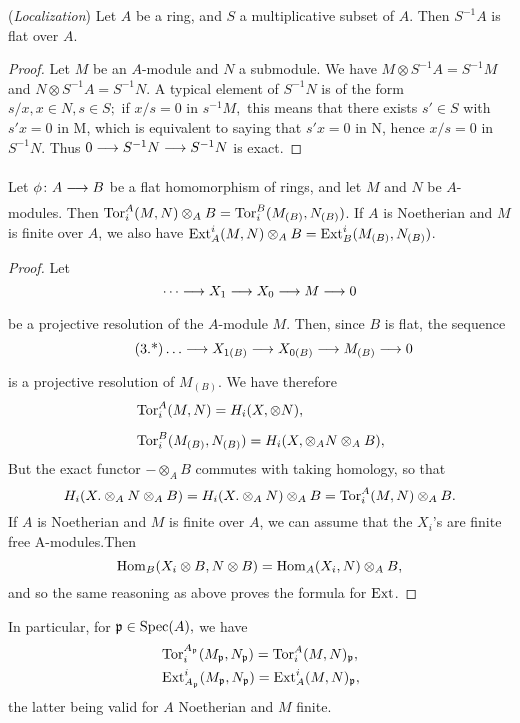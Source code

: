 \documentclass[../main]{subfiles}
\begin{document}
\newparagraph (\emph{Localization}) Let $A$ be a ring, and $S$ a multiplicative subset of $A$. Then $S^{-1}A$ is flat over $A$. 

\begin{proof} 
    Let $M$ be an $A$-module and $N$ a submodule. We have $M \otimes S^{-1}A = S^{-1}M$ and $N \otimes S^{-1}A = S^{-1}N.$ A typical element of $S^{-1}N$ is of the form $s/ x, x\in N, s \in S;$ if $x/ s = 0$ in $s^{-1}M,$ this means that there exists $s' \in S$ with $s'x = 0 $ in M, which is equivalent to saying that $s'x = 0$ in N, hence $x/ s =0$ in $S^{-1}N.$ Thus $0 \varrightarrow{} S^{-1}N \varrightarrow{} S^{-1}N$ is exact.
\end{proof}

\newparagraph Let $\phi\colon A \varrightarrow{} B  $ be a flat homomorphism of rings, and let $M$ and $N$ be $A$-modules. Then $\operatorname{Tor}_i^A(M,N) \otimes_A B = \operatorname{Tor}_i^B (M_{(B)}, N_{(B)}) $. If $A$ is Noetherian and $M$ is finite over $A$, we also have $\operatorname{Ext}_A^i(M,N) \otimes_AB = \operatorname{Ext}_B^i(M_{(B)}, N_{(B)}) $. 


\begin{proof} 
    Let \[\cdots \varrightarrow{} X_1 \varrightarrow{} X_0 \varrightarrow{} M \varrightarrow{} 0\] be a projective resolution of the $A$-module $M$. Then, since $B$ is flat, the sequence
     \[\tag{3.*}\label{eqn:3.*}
        \ldots \varrightarrow{} X_{1(B)} \varrightarrow{} X_{0(B)} \varrightarrow{} M_{(B)} \varrightarrow{} 0
    \]
    is a projective resolution of $M_{(B)}$. We have therefore 
    \begin{align*}
        &\operatorname{Tor}_i^A(M,N) = H_i(X,\otimes N),\\[0.5em]
        &\operatorname{Tor}_i^B(M_{(B)}, N_{(B)}) = H_i(X, \otimes_A N \otimes_A B),
    \end{align*}
    But the exact functor $-\otimes_AB$ commutes with taking homology, so that 
    \[
        H_i(X.\otimes_AN\otimes_A B) = H_i(X.\otimes_AN)\otimes_A B = \operatorname{Tor}_i^A (M,N) \otimes_AB.
    \] 
    If $A$ is Noetherian and $M$ is finite over $A$, we can assume that the $X_i$'s are finite free A-modules.Then \[\operatorname{Hom}_B(X_i\otimes B, N \otimes B) = \operatorname{Hom}_A(X_i, N) \otimes_A B,\] and so the same reasoning as above proves the formula for $\operatorname{Ext}$. 
\end{proof}
In particular, for $\mathfrak{p} \in \operatorname{Spec}(A),$ we have 
\begin{align*}
    &\operatorname{Tor}_i^{A_{\mathfrak{p}}} (M_{\mathfrak{p}}, N_{\mathfrak{p}}) = \operatorname{Tor}_i^A (M,N)_{\mathfrak{p}}, \\
    &\operatorname{Ext}^i_{A_{\mathfrak{p}}} (M_{\mathfrak{p}}, N_{\mathfrak{p}}) =\operatorname{Ext}^i_A (M,N)_{\mathfrak{p}}, 
\end{align*}
the latter being valid for $A$ Noetherian and $M$ finite.
\end{document}
